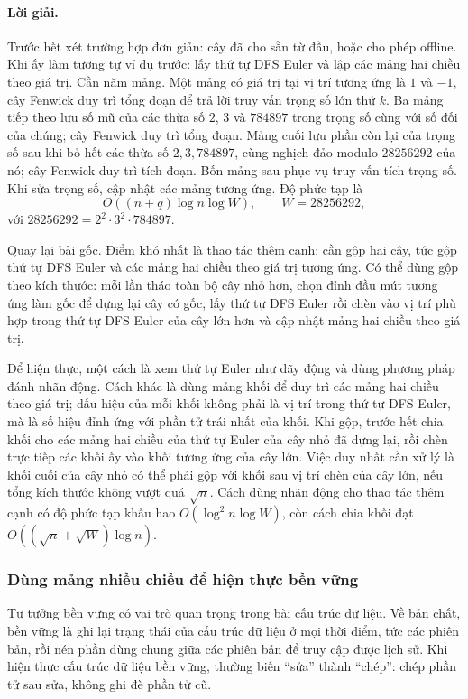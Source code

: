 \documentclass[11pt]{article}
\begin{document}
\paragraph{Lời giải.}
Trước hết xét trường hợp đơn giản: cây đã cho sẵn từ đầu, hoặc cho phép
offline. Khi ấy làm tương tự ví dụ trước: lấy thứ tự DFS Euler và lập các mảng
hai chiều theo giá trị. Cần năm mảng. Một mảng có giá trị tại vị trí tương ứng
là \(1\) và \(-1\), cây Fenwick duy trì tổng đoạn để trả lời truy vấn trọng số
lớn thứ \(k\). Ba mảng tiếp theo lưu số mũ của các thừa số \(2\), \(3\) và
\(784897\) trong trọng số cùng với số đối của chúng; cây Fenwick duy trì tổng
đoạn. Mảng cuối lưu phần còn lại của trọng số sau khi bỏ hết các thừa số
\(2,3,784897\), cùng nghịch đảo modulo \(28256292\) của nó; cây Fenwick duy
trì tích đoạn. Bốn mảng sau phục vụ truy vấn tích trọng số. Khi sửa trọng số,
cập nhật các mảng tương ứng. Độ phức tạp là
\[
  O((n+q)\log n\log W),\qquad W=28256292,
\]
với \(28256292=2^2\cdot3^2\cdot784897\).

Quay lại bài gốc. Điểm khó nhất là thao tác thêm cạnh: cần gộp hai cây, tức
gộp thứ tự DFS Euler và các mảng hai chiều theo giá trị tương ứng. Có thể dùng
gộp theo kích thước: mỗi lần tháo toàn bộ cây nhỏ hơn, chọn đỉnh đầu mút tương
ứng làm gốc để dựng lại cây có gốc, lấy thứ tự DFS Euler rồi chèn vào vị trí
phù hợp trong thứ tự DFS Euler của cây lớn hơn và cập nhật mảng hai chiều theo
giá trị.

Để hiện thực, một cách là xem thứ tự Euler như dãy động và dùng phương pháp
đánh nhãn động. Cách khác là dùng mảng khối để duy trì các mảng hai chiều theo
giá trị; dấu hiệu của mỗi khối không phải là vị trí trong thứ tự DFS Euler, mà
là số hiệu đỉnh ứng với phần tử trái nhất của khối. Khi gộp, trước hết chia
khối cho các mảng hai chiều của thứ tự Euler của cây nhỏ đã dựng lại, rồi chèn
trực tiếp các khối ấy vào khối tương ứng của cây lớn. Việc duy nhất cần xử lý
là khối cuối của cây nhỏ có thể phải gộp với khối sau vị trí chèn của cây lớn,
nếu tổng kích thước không vượt quá \(\sqrt n\). Cách dùng nhãn động cho thao
tác thêm cạnh có độ phức tạp khấu hao \(O(\log^2 n\log W)\), còn cách chia
khối đạt \(O((\sqrt n+\sqrt W)\log n)\).

\subsubsection{Dùng mảng nhiều chiều để hiện thực bền vững}

Tư tưởng bền vững có vai trò quan trọng trong bài cấu trúc dữ liệu. Về bản
chất, bền vững là ghi lại trạng thái của cấu trúc dữ liệu ở mọi thời điểm, tức
các phiên bản, rồi nén phần dùng chung giữa các phiên bản để truy cập được
lịch sử. Khi hiện thực cấu trúc dữ liệu bền vững, thường biến ``sửa'' thành
``chép'': chép phần tử sau sửa, không ghi đè phần tử cũ.
\end{document}
